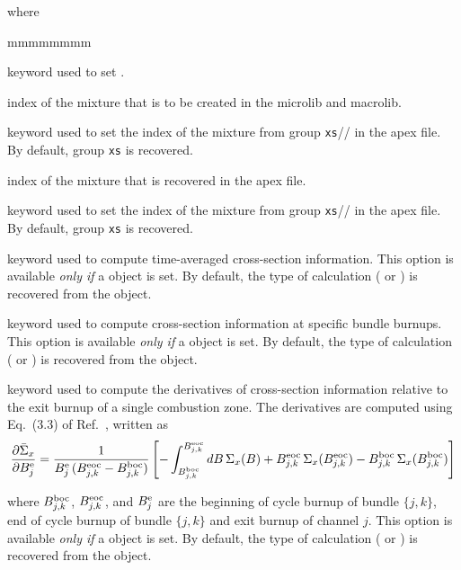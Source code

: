\noindent where
\begin{ListeDeDescription}{mmmmmmmm}

\item[\moc{MIX}] keyword used to set .

\item[\dusa{imix}] index of the mixture that is to be created in the {\sc microlib} and {\sc macrolib}.

\item[\moc{FROM}] keyword used to set the index of the mixture from group {\tt xs}// in the {\sc apex} file. By default, group {\tt xs} is recovered.

\item[\dusa{imixold}] index of the mixture that is recovered in the {\sc apex} file.

\item[\moc{USE}] keyword used to set the index of the mixture from group {\tt xs}// in the {\sc apex} file. By default, group {\tt xs} is recovered.

\item[\moc{TIMAV-BURN}] keyword used to compute time-averaged cross-section information. This option is available {\sl only if} a  object is set.
By default, the type of calculation ( or ) is recovered from the  object.

\item[\moc{INST-BURN}] keyword used to compute cross-section information at specific bundle burnups. This option is available {\sl only if} a  object is set.
By default, the type of calculation ( or ) is recovered from the  object.

\item[\moc{AVG-EX-BURN}] keyword used to compute the derivatives of cross-section information relative to the exit burnup of a single combustion zone. The derivatives are computed using Eq.~(3.3) of Ref.~, written as
$$
{\partial \bar\Sigma_x\over \partial B_j^{\rm e}}={1\over B_j^{\rm e}\, (B_{j,k}^{\rm eoc}-B_{j,k}^{\rm boc})}
\left[- \int_{B_{j,k}^{\rm boc}}^{B_{j,k}^{\rm eoc}}dB \, \Sigma_x(B)+B_{j,k}^{\rm eoc}\, \Sigma_x(B_{j,k}^{\rm eoc})-B_{j,k}^{\rm boc}\, \Sigma_x(B_{j,k}^{\rm boc})\right]
$$

\noindent where $B_{j,k}^{\rm boc}$, $B_{j,k}^{\rm eoc}$, and $B_j^{\rm e}$ are the beginning of cycle burnup of bundle $\{j,k\}$, end of cycle burnup of bundle $\{j,k\}$ and exit burnup of channel $j$. This option is available {\sl only if} a  object is set.
By default, the type of calculation ( or ) is recovered from the  object.


\end{ListeDeDescription}
